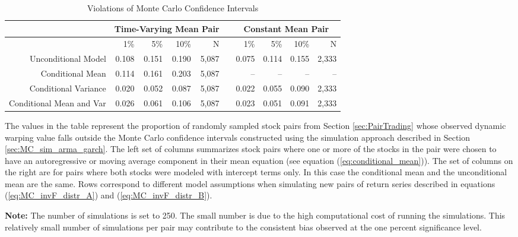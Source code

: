 \begin{table}[!ht]
    \centering
    \begin{threeparttable}
        \caption{Violations of Monte Carlo Confidence Intervals} \label{tbl:monte_carlo_confidence_intervals}
        \begin{tabular}{r r r r r r r r r r}
            \midrule
             & \multicolumn{4}{c}{Time-Varying Mean Pair} & & \multicolumn{4}{c}{Constant Mean Pair}    \\
            \midrule
                                     & 1\%   & 5\%   & 10\%  & N     & & 1\%   & 5\%   & 10\%  & N     \\
            Unconditional Model      & 0.108 & 0.151 & 0.190 & 5,087 & & 0.075 & 0.114 & 0.155 & 2,333 \\
            Conditional Mean         & 0.114 & 0.161 & 0.203 & 5,087 & &    -- &    -- &    -- &   --  \\
            Conditional Variance     & 0.020 & 0.052 & 0.087 & 5,087 & & 0.022 & 0.055 & 0.090 & 2,333 \\
            Conditional Mean and Var & 0.026 & 0.061 & 0.106 & 5,087 & & 0.023 & 0.051 & 0.091 & 2,333 \\
            \cmidrule{1-10}
        \end{tabular}
        \begin{tablenotes}
            \item{The values in the table represent the proportion of randomly sampled stock pairs from Section \ref{sec:PairTrading} whose observed dynamic warping value falls outside the Monte Carlo confidence intervals constructed using the simulation approach described in Section \ref{sec:MC_sim_arma_garch}. The left set of columns summarizes stock pairs where one or more of the stocks in the pair were chosen to have an autoregressive or moving average component in their mean equation (see equation (\ref{eq:conditional_mean})). The set of columns on the right are for pairs where both stocks were modeled with intercept terms only. In this case the conditional mean and the unconditional mean are the same. Rows correspond to different model assumptions when simulating new pairs of return series described in equations (\ref{eq:MC_invF_distr_A}) and (\ref{eq:MC_invF_distr_B}).}
            \item \textbf{Note:} The number of simulations is set to 250. The small number is due to the high computational cost of running the simulations. This relatively small number of simulations per pair may contribute to the consistent bias observed at the one percent significance level.
        \end{tablenotes}
    \end{threeparttable}
\end{table}



